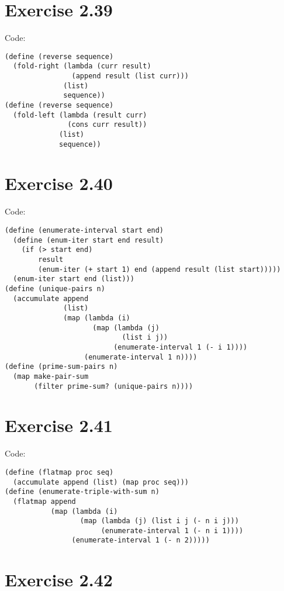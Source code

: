 \documentclass[../main.tex]{subfiles}
\begin{document}
\section{Exercise 2.39}

Code:

\begin{lstlisting}
(define (reverse sequence)
  (fold-right (lambda (curr result)
                (append result (list curr)))
              (list)
              sequence))
(define (reverse sequence)
  (fold-left (lambda (result curr)
               (cons curr result))
             (list)
             sequence))
\end{lstlisting}

\section{Exercise 2.40}

Code:

\begin{lstlisting}
(define (enumerate-interval start end)
  (define (enum-iter start end result)
    (if (> start end)
        result
        (enum-iter (+ start 1) end (append result (list start)))))
  (enum-iter start end (list)))
(define (unique-pairs n)
  (accumulate append
              (list)
              (map (lambda (i)
                     (map (lambda (j)
                            (list i j))
                          (enumerate-interval 1 (- i 1))))
                   (enumerate-interval 1 n))))
(define (prime-sum-pairs n)
  (map make-pair-sum
       (filter prime-sum? (unique-pairs n))))
\end{lstlisting}

\section{Exercise 2.41}

Code:

\begin{lstlisting}
(define (flatmap proc seq)
  (accumulate append (list) (map proc seq)))
(define (enumerate-triple-with-sum n)
  (flatmap append
           (map (lambda (i)
                  (map (lambda (j) (list i j (- n i j)))
                       (enumerate-interval 1 (- n i 1))))
                (enumerate-interval 1 (- n 2)))))
\end{lstlisting}

\section{Exercise 2.42}
\end{document}
